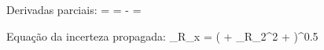 
            Derivadas parciais:
             = 
 = - 
 = 

            Equação da incerteza propagada:
            \sigma_R_x = \left( +  \sigma_R_2^{2} + \right)^{0.5}
